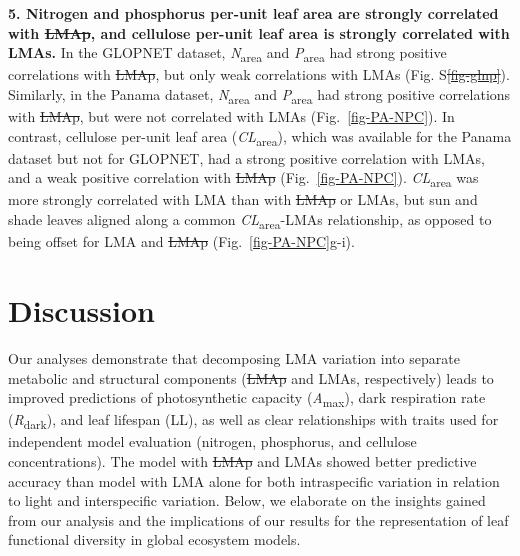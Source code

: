 \documentclass[
  12pt,
  a4paper,
,tablecaptionabove
]{scrartcl}
\providecommand{\DIFaddtex}[1]{{\protect\color{blue}\uwave{#1}}} %
\providecommand{\DIFdeltex}[1]{{\protect\color{red}\sout{#1}}}                      %
\providecommand{\DIFaddbegin}{} %
\providecommand{\DIFaddend}{} %
\providecommand{\DIFdelbegin}{} %
\providecommand{\DIFdelend}{} %
\providecommand{\DIFadd}[1]{\texorpdfstring{\DIFaddtex{#1}}{#1}} %
\providecommand{\DIFdel}[1]{\texorpdfstring{\DIFdeltex{#1}}{}} %
\newcommand{\DIFscaledelfig}{0.5}
\newlength{\DIFdelgraphicswidth} %
\newlength{\DIFdelgraphicsheight} %
\newcommand{\DIFaddincludegraphics}[2][]{{\color{blue}\fbox{\DIFOincludegraphics[#1]{#2}}}} %
\newcommand{\DIFdelincludegraphics}[2][]{%
\sbox{\DIFdelgraphicsbox}{\DIFOincludegraphics[#1]{#2}}%
\settoboxwidth{\DIFdelgraphicswidth}{\DIFdelgraphicsbox} %
\settoboxtotalheight{\DIFdelgraphicsheight}{\DIFdelgraphicsbox} %
\scalebox{\DIFscaledelfig}{%
\parbox[b]{\DIFdelgraphicswidth}{\usebox{\DIFdelgraphicsbox}\\[-\baselineskip] \rule{\DIFdelgraphicswidth}{0em}}\llap{\resizebox{\DIFdelgraphicswidth}{\DIFdelgraphicsheight}{%
\setlength{\unitlength}{\DIFdelgraphicswidth}%
\begin{picture}(1,1)%
\thicklines\linethickness{2pt} %
{\color[rgb]{1,0,0}\put(0,0){\framebox(1,1){}}}%
{\color[rgb]{1,0,0}\put(0,0){\line( 1,1){1}}}%
{\color[rgb]{1,0,0}\put(0,1){\line(1,-1){1}}}%
\end{picture}%
}\hspace*{3pt}}} %
} %
\DeclareRobustCommand{\DIFaddbegin}{\DIFOaddbegin \let\includegraphics\DIFaddincludegraphics} %
\DeclareRobustCommand{\DIFaddend}{\DIFOaddend \let\includegraphics\DIFOincludegraphics} %
\DeclareRobustCommand{\DIFdelbegin}{\DIFOdelbegin \let\includegraphics\DIFdelincludegraphics} %
\DeclareRobustCommand{\DIFdelend}{\DIFOaddend \let\includegraphics\DIFOincludegraphics} %
\begin{document}
\textbf{5. Nitrogen and phosphorus per-unit leaf area are strongly
correlated with \DIFdelbegin \DIFdel{LMAp}\DIFdelend \DIFaddbegin \DIFadd{LMAm}\DIFaddend , and cellulose per-unit leaf area is strongly
correlated with LMAs.} In the GLOPNET dataset,
\emph{N}\textsubscript{area} and \emph{P}\textsubscript{area} had strong
positive correlations with \DIFdelbegin \DIFdel{LMAp}\DIFdelend \DIFaddbegin \DIFadd{LMAm}\DIFaddend , but only weak correlations with LMAs
(Fig. S\DIFdelbegin \DIFdel{\ref{fig-glnp}}\DIFdelend \DIFaddbegin \DIFadd{\ref{fig-gl_point_np2}}\DIFaddend ). Similarly, in the Panama dataset,
\emph{N}\textsubscript{area} and \emph{P}\textsubscript{area} had strong
positive correlations with \DIFdelbegin \DIFdel{LMAp}\DIFdelend \DIFaddbegin \DIFadd{LMAm}\DIFaddend , but were not correlated with LMAs
(Fig.~\ref{fig-PA-NPC}). In contrast, cellulose per-unit leaf area
(\emph{CL}\textsubscript{area}), which was available for the Panama
dataset but not for GLOPNET, had a strong positive correlation with
LMAs, and a weak positive correlation with \DIFdelbegin \DIFdel{LMAp }\DIFdelend \DIFaddbegin \DIFadd{LMAm }\DIFaddend (Fig.~\ref{fig-PA-NPC}).
\emph{CL}\textsubscript{area} was more strongly correlated with LMA than
with \DIFdelbegin \DIFdel{LMAp }\DIFdelend \DIFaddbegin \DIFadd{LMAm }\DIFaddend or LMAs, but sun and shade leaves aligned along a common
\emph{CL}\textsubscript{area}-LMAs relationship, as opposed to being
offset for LMA and \DIFdelbegin \DIFdel{LMAp }\DIFdelend \DIFaddbegin \DIFadd{LMAm }\DIFaddend (Fig.~\ref{fig-PA-NPC}g-i).

\hypertarget{discussion}{%
\section{Discussion}\label{discussion}}

Our analyses demonstrate that decomposing LMA variation into separate
metabolic and structural components (\DIFdelbegin \DIFdel{LMAp }\DIFdelend \DIFaddbegin \DIFadd{LMAm }\DIFaddend and LMAs, respectively) leads
to improved predictions of photosynthetic capacity
(\emph{A}\textsubscript{max}), dark respiration rate
(\emph{R}\textsubscript{dark}), and leaf lifespan (LL), as well as clear
relationships with traits used for independent model evaluation
(nitrogen, phosphorus, and cellulose concentrations). The model with
\DIFdelbegin \DIFdel{LMAp }\DIFdelend \DIFaddbegin \DIFadd{LMAm }\DIFaddend and LMAs showed better predictive accuracy than model with LMA
alone for both intraspecific variation in relation to light and
interspecific variation. Below, we elaborate on the insights gained from
our analysis and the implications of our results for the representation
of leaf functional diversity in global ecosystem models.
\end{document}
